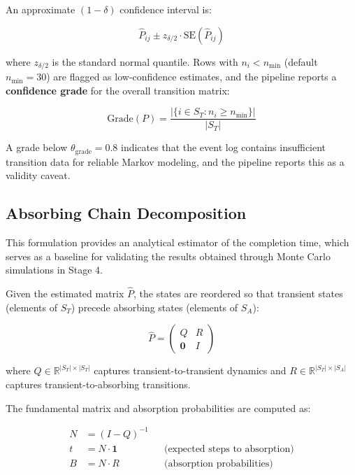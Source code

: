 An approximate $(1 - \delta)$ confidence interval is:

\begin{equation}
\label{eq:ci-transition}
\hat{P}_{ij} \pm z_{\delta/2} \cdot \text{SE}(\hat{P}_{ij})
\end{equation}

where $z_{\delta/2}$ is the standard normal quantile. Rows with 
$n_i < n_{\min}$ (default $n_{\min} = 30$) are flagged as low-confidence 
estimates, and the pipeline reports a \textbf{confidence grade} for the 
overall transition matrix:

\begin{equation}
\label{eq:confidence-grade}
\text{Grade}(P) = \frac{|\{i \in S_T : n_i \geq n_{\min}\}|}{|S_T|}
\end{equation}

A grade below $\theta_{\text{grade}} = 0.8$ indicates that the event log 
contains insufficient transition data for reliable Markov modeling, and 
the pipeline reports this as a validity caveat.


\subsection{Absorbing Chain Decomposition}
\label{sec:s3-absorbing}
This formulation provides an analytical estimator of the completion time, which serves as a baseline for validating the results obtained through Monte Carlo simulations in Stage 4.

Given the estimated matrix $\hat{P}$, the states are reordered so that 
transient states (elements of $S_T$) precede absorbing states (elements 
of $S_A$):

\begin{equation}
\label{eq:absorbing-decomposition}
\hat{P} = \begin{pmatrix} Q & R \\ \mathbf{0} & I \end{pmatrix}
\end{equation}

where $Q \in \mathbb{R}^{|S_T| \times |S_T|}$ captures transient-to-transient 
dynamics and $R \in \mathbb{R}^{|S_T| \times |S_A|}$ captures 
transient-to-absorbing transitions.

The fundamental matrix and absorption probabilities are computed as:

\begin{align}
N &= (I - Q)^{-1} \label{eq:fundamental-computation} \\
t &= N \cdot \mathbf{1} && \text{(expected steps to absorption)} \label{eq:expected-steps} \\
B &= N \cdot R && \text{(absorption probabilities)} \label{eq:absorption-prob}
\end{align}


